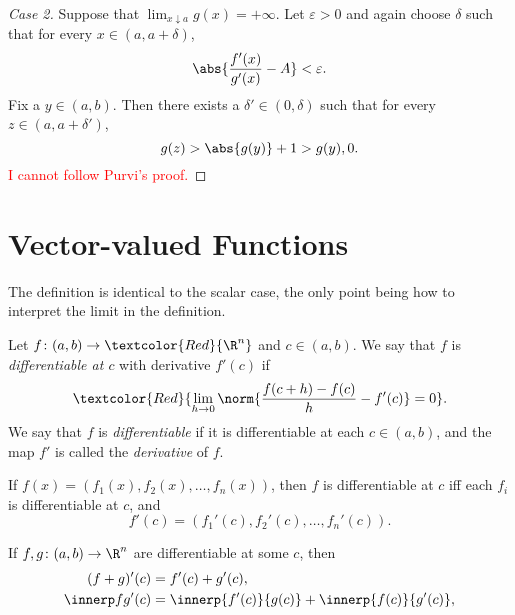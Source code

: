 \begin{proof}[Case 2]
    Suppose that $\lim_{x \downarrow a} g(x) = +\infty$.
    Let $\varepsilon > 0$ and again choose $\delta$ such that for every
    $x \in (a, a + \delta)$, \[
        \abs{\frac{f'(x)}{g'(x)} - A} < \varepsilon.
    \]
    Fix a $y \in (a, b)$.
    Then there exists a $\delta' \in (0, \delta)$ such that
    for every $z \in (a, a + \delta')$, \[
        g(z) > \abs{g(y)} + 1 > g(y), 0.
    \]
    \textcolor{Red}{I cannot follow Purvi's proof.}
\end{proof}

\section{Vector-valued Functions} \label{sec:diff:vector}
The definition is identical to the scalar case, the only point being how to
interpret the limit in the definition.
\begin{definition}[Differentiation] \label{def:diff:vector}
    Let $f\colon (a, b) \to \textcolor{Red}{\R^n}$ and $c \in (a, b)$.
    We say that $f$ is \emph{differentiable at $c$} with derivative $f'(c)$
    if \[
        \textcolor{Red}{\lim_{h \to 0} \norm{\frac{f(c + h) - f(c)}{h} - f'(c)} = 0}.
    \]
    We say that $f$ is \emph{differentiable} if it is differentiable at
    each $c \in (a, b)$, and the map $f'$ is called the \emph{derivative}
    of $f$.
\end{definition}
\begin{remarks}
    \item If $f(x) = (f_1(x), f_2(x), \dots, f_n(x))$, then
    $f$ is differentiable at $c$ iff each $f_i$ is differentiable at $c$,
    and \[
        f'(c) = (f_1'(c), f_2'(c), \dots, f_n'(c)).
    \]
    \item If $f, g\colon (a, b) \to \R^n$ are differentiable at some $c$,
    then \begin{align*}
        (f + g)'(c) &= f'(c) + g'(c), \\
        \innerp fg'(c) &= \innerp{f'(c)}{g(c)} + \innerp{f(c)}{g'(c)}, \\
    \end{align*}
\end{remarks}

